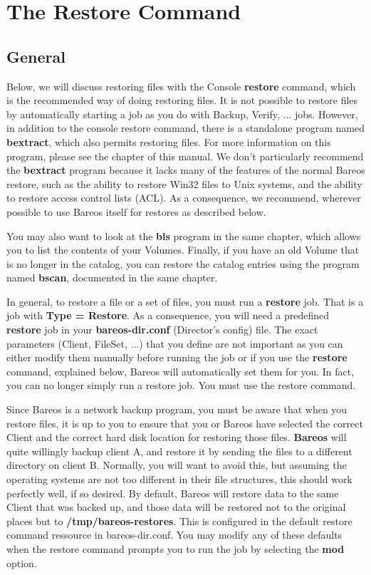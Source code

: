 \chapter{The Restore Command}
\label{RestoreChapter}

\section{General}

Below, we will discuss restoring files with the Console {\bf restore} command,
which is the recommended way of doing restoring files. It is not possible
to restore files by automatically starting a job as you do with Backup,
Verify, ... jobs.  However, in addition to the console restore command,
there is a standalone program named {\bf bextract}, which also permits
restoring files.  For more information on this program, please see the
 chapter of this manual. We
don't particularly recommend the {\bf bextract} program because it
lacks many of the features of the normal Bareos restore, such as the
ability to restore Win32 files to Unix systems, and the ability to
restore access control lists (ACL).  As a consequence, we recommend,
wherever possible to use Bareos itself for restores as described below.

You may also want to look at the {\bf bls} program in the same chapter,
which allows you to list the contents of your Volumes.  Finally, if you
have an old Volume that is no longer in the catalog, you can restore the
catalog entries using the program named {\bf bscan}, documented in the same
 chapter.

In general, to restore a file or a set of files, you must run a {\bf restore}
job. That is a job with {\bf Type = Restore}. As a consequence, you will need
a predefined {\bf restore} job in your {\bf bareos-dir.conf} (Director's
config) file. The exact parameters (Client, FileSet, ...) that you define are
not important as you can either modify them manually before running the job or
if you use the {\bf restore} command, explained below, Bareos will
automatically set them for you. In fact, you can no longer simply run a restore
job.  You must use the restore command.

Since Bareos is a network backup program, you must be aware that when you
restore files, it is up to you to ensure that you or Bareos have selected the
correct Client and the correct hard disk location for restoring those files.
{\bf Bareos} will quite willingly backup client A, and restore it by sending
the files to a different directory on client B. Normally, you will want to
avoid this, but assuming the operating systems are not too different in their
file structures, this should work perfectly well, if so desired.
By default, Bareos will restore data to the same Client that was backed
up, and those data will be restored not to the original places but to
{\bf /tmp/bareos-restores}. This is configured in the default restore
command ressource in bareos-dir.conf.  You may modify any of these defaults when the
restore command prompts you to run the job by selecting the {\bf mod}
option.


